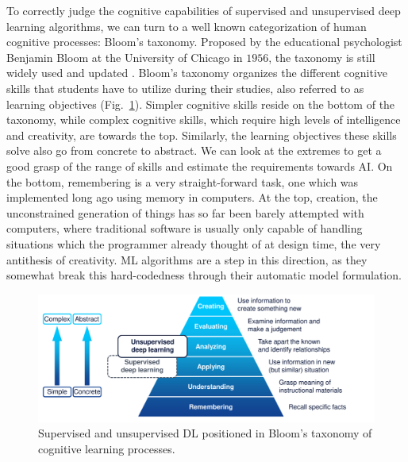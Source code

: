 			To correctly judge the cognitive capabilities of supervised and unsupervised deep learning algorithms, we can turn to a well known categorization of human cognitive processes: Bloom's taxonomy.			
			Proposed by the educational psychologist Benjamin Bloom at the University of Chicago in $1956$, the taxonomy is still widely used and updated \cite{bloom_taxonomy}. 
			Bloom's taxonomy organizes the different cognitive skills that students have to utilize during their studies, also referred to as learning objectives (Fig.~\ref{fig:bloom_taxonomy}).
			Simpler cognitive skills reside on the bottom of the taxonomy, while complex cognitive skills, which require high levels of intelligence and creativity, are towards the top.
			Similarly, the learning objectives these skills solve also go from concrete to abstract.
			We can look at the extremes to get a good grasp of the range of skills and estimate the requirements towards \ac{AI}.
			On the bottom, remembering is a very straight-forward task, one which was implemented long ago using memory in computers.
			At the top, creation, the unconstrained generation of things has so far been barely attempted with computers, where traditional software is usually only capable of handling situations which the programmer already thought of at design time, the very antithesis of creativity.
			\ac{ML} algorithms are a step in this direction, as they somewhat break this hard-codedness through their automatic model formulation.
			
			\begin{figure}[ht]
				\centering
				\includegraphics[width=\linewidth]{figures/01_introduction/bloom_taxonomy/bloom_taxonomy.pdf}
				\caption[Bloom’s taxonomy of cognitive learning processes]{Supervised and unsupervised DL positioned in Bloom’s taxonomy of cognitive learning processes.}
				\label{fig:bloom_taxonomy}
			\end{figure}
			
